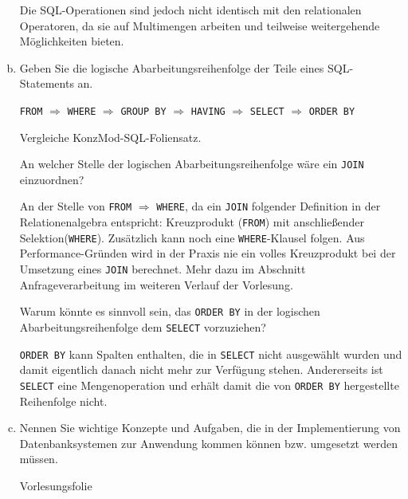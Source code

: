 \begin{enumerate}[a)]
\begin{solution}
	Die SQL-Operationen sind jedoch nicht identisch mit den relationalen Operatoren, da sie auf Multimengen arbeiten und teilweise weitergehende Möglichkeiten bieten.
	\end{solution}


	\item Geben Sie die logische Abarbeitungsreihenfolge der Teile eines SQL-Statements an.

	\begin{solution}
	\texttt{FROM} $\Rightarrow$ \texttt{WHERE} $\Rightarrow$ \texttt{GROUP BY} $\Rightarrow$ \texttt{HAVING} $\Rightarrow$ \texttt{SELECT} $\Rightarrow$ \texttt{ORDER BY}

	Vergleiche KonzMod-SQL-Foliensatz.

	An welcher Stelle der logischen Abarbeitungsreihenfolge wäre ein \texttt{JOIN} einzuordnen?

	An der Stelle von \texttt{FROM} $\Rightarrow$ \texttt{WHERE}, da ein \texttt{JOIN} folgender Definition in der Relationenalgebra entspricht:	Kreuzprodukt (\texttt{FROM}) mit anschließender Selektion(\texttt{WHERE}).
	Zusätzlich kann noch eine \texttt{WHERE}-Klausel folgen.
	Aus Performance-Gründen wird in der Praxis nie ein volles Kreuzprodukt bei der Umsetzung eines \texttt{JOIN} berechnet.
	Mehr dazu im Abschnitt Anfrageverarbeitung im weiteren Verlauf der Vorlesung.

	Warum könnte es sinnvoll sein, das \texttt{ORDER BY} in der logischen Abarbeitungsreihenfolge dem \texttt{SELECT} vorzuziehen?

	\texttt{ORDER BY} kann Spalten enthalten, die in \texttt{SELECT} nicht ausgewählt wurden und damit eigentlich danach nicht mehr zur Verfügung stehen.
	Andererseits ist \texttt{SELECT} eine Mengenoperation und erhält damit die von \texttt{ORDER BY} hergestellte Reihenfolge nicht.
	\end{solution}

	\item Nennen \deepen Sie wichtige Konzepte und Aufgaben, die in der Implementierung von Datenbanksystemen zur Anwendung kommen können bzw. umgesetzt werden müssen.

	\begin{note}
		Vorlesungsfolie~\DBSKonzepteAufgaben
	\end{note}
\end{enumerate}

